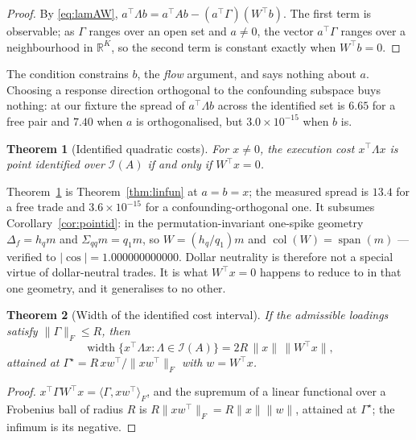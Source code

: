 \documentclass[10pt,twocolumn]{article}
\newtheorem{theorem}{Theorem}
\theoremstyle{remark}
\newcommand{\col}{\operatorname{col}}
\newcommand{\spann}{\operatorname{span}}
\begin{document}
\begin{proof}
By \eqref{eq:lamAW}, $a^\top\Lambda b=a^\top Ab-(a^\top\Gamma)(W^\top b)$. The
first term is observable; as $\Gamma$ ranges over an open set and $a\ne0$, the
vector $a^\top\Gamma$ ranges over a neighbourhood in $\mathbb R^K$, so the
second term is constant exactly when $W^\top b=0$.
\end{proof}

The condition constrains $b$, the \emph{flow} argument, and says nothing about
$a$. Choosing a response direction orthogonal to the confounding subspace buys
nothing: at our fixture the spread of $a^\top\Lambda b$ across the identified
set is $6.65$ for a free pair and $7.40$ when $a$ is orthogonalised, but
$3.0\times10^{-15}$ when $b$ is.

\begin{theorem}[Identified quadratic costs]
\label{thm:quadfun}
For $x\ne0$, the execution cost $x^\top\Lambda x$ is point identified over
$\mathcal I(A)$ if and only if $W^\top x=0$.
\end{theorem}

Theorem~\ref{thm:quadfun} is Theorem~\ref{thm:linfun} at $a=b=x$; the measured
spread is $13.4$ for a free trade and $3.6\times10^{-15}$ for a
confounding-orthogonal one. It subsumes
Corollary~\ref{cor:pointid}: in the permutation-invariant one-spike geometry
$\Delta_f=h_q m$ and $\Sigma_{qq}m=q_1m$, so $W=(h_q/q_1)m$ and
$\col(W)=\spann(m)$ --- verified to $\lvert\cos\rvert=1.000000000000$. Dollar
neutrality is therefore not a special virtue of dollar-neutral trades. It is
what $W^\top x=0$ happens to reduce to in that one geometry, and it generalises
to no other.

\begin{theorem}[Width of the identified cost interval]
\label{thm:width}
If the admissible loadings satisfy $\lVert\Gamma\rVert_F\le R$, then
\begin{equation}
\operatorname{width}\{x^\top\Lambda x:\Lambda\in\mathcal I(A)\}
=2R\,\lVert x\rVert\,\lVert W^\top x\rVert,
\label{eq:width}
\end{equation}
attained at $\Gamma^\star=R\,xw^\top/\lVert xw^\top\rVert_F$ with $w=W^\top x$.
\end{theorem}

\begin{proof}
$x^\top\Gamma W^\top x=\langle\Gamma,xw^\top\rangle_F$, and the supremum of a
linear functional over a Frobenius ball of radius $R$ is
$R\lVert xw^\top\rVert_F=R\lVert x\rVert\lVert w\rVert$, attained at
$\Gamma^\star$; the infimum is its negative.
\end{proof}
\end{document}
